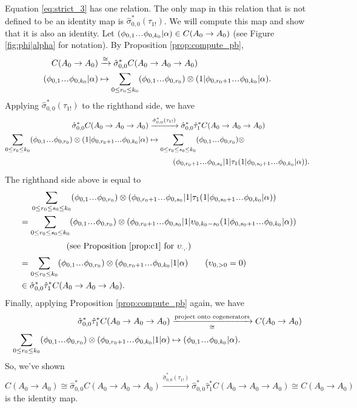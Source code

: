 Equation \ref{eq:strict_3} has one relation. 
The only map in this relation that is not 
defined to be an identity map is $\hat{\sigma}_{0,0}^*
(\tau_{1!})$. We will compute this map and 
show that it is also an identity. 
Let $(\phi_{0,1}\smdots \phi_{0,k_0}|\alpha)
\in C(A_0 \to A_0)$ (see Figure \ref{fig:phi|alpha} 
for notation). By Proposition \ref{prop:compute_pb},
\begin{align*}
C(A_0 \to A_0)
&\xrightarrow{\cong} 
\hat{\sigma}_{0,0}^*C(A_0 \to A_0 \to A_0)\\
(\phi_{0,1}\smdots \phi_{0,k_0}|\alpha)
&\mapsto
\sum \limits_{0 \leq r_0 \leq k_0}
  (\phi_{0,1}\smdots \phi_{0,r_0}) \otimes 
  (1 | \phi_{0,r_0+1}\smdots \phi_{0,k_0}|\alpha).
\end{align*}
Applying $\hat{\sigma}_{0,0}^*(\tau_{1!})$
to the righthand side, we have
\begin{align*}
\hat{\sigma}_{0,0}^*C(A_0 \to A_0 \to A_0)
&\xrightarrow{\hat{\sigma}_{0,0}^*(\tau_{1!})}
\hat{\sigma}_{0,0}^*\hat{\tau}_1^*C(A_0 \to A_0 \to A_0)\\
\sum \limits_{0 \leq r_0 \leq k_0}
  (\phi_{0,1}\smdots \phi_{0,r_0}) \otimes 
  (1 | \phi_{0,r_0+1}\smdots \phi_{0,k_0}|\alpha)
&\mapsto
\sum \limits_{0 \leq r_0 \leq s_0 \leq k_0}
  (\phi_{0,1}\smdots \phi_{0,r_0}) \otimes \\
&\phantom{{}\mapsto \sum{}}  
  (\phi_{0,r_0+1}\smdots \phi_{0,s_0}|1|
  \tau_1(1|\phi_{0,s_0+1}\smdots\phi_{0,k_0}|\alpha)).
\end{align*}
The righthand side above is equal to
\begin{align*}
&\phantom{{}={}}
\sum \limits_{0 \leq r_0 \leq s_0 \leq k_0}
  (\phi_{0,1}\smdots \phi_{0,r_0}) \otimes 
  (\phi_{0,r_0+1}\smdots \phi_{0,s_0}|1|
  \tau_1(1|\phi_{0,s_0+1}\smdots\phi_{0,k_0}|\alpha))\\
&=  
\sum \limits_{0 \leq r_0 \leq s_0 \leq k_0}
  (\phi_{0,1}\smdots \phi_{0,r_0}) \otimes 
  (\phi_{0,r_0+1}\smdots \phi_{0,s_0}|1|
  \upsilon_{0,k_0-s_0}(1|\phi_{0,s_0+1}\smdots\phi_{0,k_0}|\alpha))\\
&\phantom{{}=\sum\sum{}}  
  \quad \textrm{(see Proposition \ref{prop:c1} for }
  \upsilon_{\cdot,\cdot})\\
&=  
\sum \limits_{0 \leq r_0 \leq k_0}
  (\phi_{0,1}\smdots \phi_{0,r_0}) \otimes 
  (\phi_{0,r_0+1}\smdots \phi_{0,k_0}|1|\alpha)
  \quad \quad (\upsilon_{0,>0}=0)\\
&\in
\hat{\sigma}_{0,0}^*\hat{\tau}_1^*C(A_0 \to A_0 \to A_0).
\end{align*}
Finally, applying Proposition 
\ref{prop:compute_pb} again, we have
\begin{align*}
\hat{\sigma}_{0,0}^*\hat{\tau}_1^*C(A_0 \to A_0 \to A_0)
&\xrightarrow[\cong]{\textrm{project onto cogenerators}} 
C(A_0 \to A_0)\\
\sum \limits_{0 \leq r_0 \leq k_0}
  (\phi_{0,1}\smdots \phi_{0,r_0}) \otimes 
  (\phi_{0,r_0+1}\smdots \phi_{0,k_0}|1|\alpha)
&\mapsto
(\phi_{0,1}\smdots \phi_{0,k_0}|\alpha).
\end{align*}
So, we've shown 
$$
C(A_0 \to A_0) \cong 
\hat{\sigma}_{0,0}^*C(A_0 \to A_0 \to A_0)
\xrightarrow{\hat{\sigma}_{0,0}^*(\tau_{1!})}
\hat{\sigma}_{0,0}^*\hat{\tau}_1^*C(A_0 \to A_0 \to A_0)
\cong C(A_0 \to A_0)
$$
is the identity map.
% 
